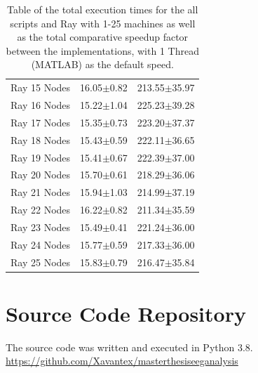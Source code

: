 \documentclass[12pt, a4paper]{article}
\begin{document}
\begin{appendices}
\begin{table}[H]
\begin{tabular}{|l|l|l|}
    Ray 15 Nodes       & 16.05$\pm$0.82     & 213.55$\pm$35.97 \\ 
    Ray 16 Nodes       & 15.22$\pm$1.04     & 225.23$\pm$39.28 \\ 
    Ray 17 Nodes       & 15.35$\pm$0.73     & 223.20$\pm$37.37 \\ 
    Ray 18 Nodes       & 15.43$\pm$0.59     & 222.11$\pm$36.65 \\ 
    Ray 19 Nodes       & 15.41$\pm$0.67     & 222.39$\pm$37.00 \\ 
    Ray 20 Nodes       & 15.70$\pm$0.61     & 218.29$\pm$36.06 \\ 
    Ray 21 Nodes       & 15.94$\pm$1.03     & 214.99$\pm$37.19 \\ 
    Ray 22 Nodes       & 16.22$\pm$0.82     & 211.34$\pm$35.59 \\ 
    Ray 23 Nodes       & 15.49$\pm$0.41     & 221.24$\pm$36.00 \\ 
    Ray 24 Nodes       & 15.77$\pm$0.59     & 217.33$\pm$36.00 \\ 
    Ray 25 Nodes       & 15.83$\pm$0.79     & 216.47$\pm$35.84 \\ \hline
    \end{tabular}

    \caption{Table of the total execution times for the all scripts and Ray with 1-25 machines as well as the total comparative speedup factor between the implementations, with 1 Thread (MATLAB) as the default speed.}
    \label{AppendixFullTimeExecSpeedup}
\end{table}


\section{Source Code Repository}

The source code was written and executed in Python 3.8. \newline
\url{https://github.com/Xavantex/masterthesiseeganalysis}

\end{appendices}
\end{document}
